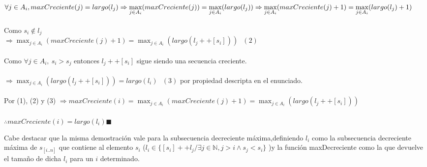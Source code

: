 $\displaystyle \forall j \in A_i , maxCreciente(j) = largo(l_j) \\
\\
 \Rightarrow \max_{j \in A_i}({maxCreciente(j)}) = \max_{j \in A_i}({largo(l_j)}) \\
 \\
 \Rightarrow \max_{j \in A_i}({maxCreciente(j) + 1}) = \max_{j \in A_i}({largo(l_j) + 1})$ \\
 \\
Como $s_i  \notin l_j$
\\
$\displaystyle \Rightarrow \max_{j \in A_i}({maxCreciente(j) + 1}) = \max_{j \in A_i}({largo(l_j ++ [s_i])}) \ \ \ (2)$ \\
\\
Como $\forall j \in A_i,\ s_i > s_j$ entonces $l_j ++ [s_i]$  sigue siendo una secuencia creciente.\\
\\
$\displaystyle \Rightarrow \max_{j \in A_i}({largo(l_j ++ [s_i])}) = largo(l_i)\ \ \ (3) $ por propiedad descripta en el enunciado. \\ 
\\
Por (1), (2) y (3)      
$\displaystyle \Rightarrow maxCreciente(i) = \max_{j \in A_i}({maxCreciente(j) + 1}) = \max_{j \in A_i}({largo(l_j ++ [s_i])})$ \\
\\
$\displaystyle \therefore maxCreciente(i) = largo(l_i) \blacksquare$ 

Cabe destacar que la misma demostración vale para la subsecuencia decreciente máxima,definiendo $l_i$ como la subsecuencia decreciente máxima de $s_[i..n]$ que contiene al elemento $s_i$ ($l_i \in
  \{ [s_i]++l_j  / \exists j \in \mathbb{N}, j > i \land s_j < s_i\}$ )y la función maxDecreciente como la que devuelve el tamaño de dicha $l_i$ para un $i$ determinado.

